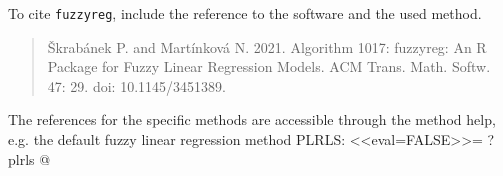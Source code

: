\documentclass[a4paper]{article}
\begin{document}
To cite \texttt{fuzzyreg}, include the reference to the software and the used method.

\begin{quote}
\v{S}krab\'{a}nek P. and Mart\'{i}nkov\'{a} N. 2021. Algorithm 1017: fuzzyreg: An R Package for 
Fuzzy Linear Regression Models. ACM Trans. Math. Softw. 47: 29. doi: 10.1145/3451389.
\end{quote}

The references for the specific methods are accessible through the method help, e.g.
the default fuzzy linear regression method PLRLS:
<<eval=FALSE>>=
?plrls
@


\end{document}
